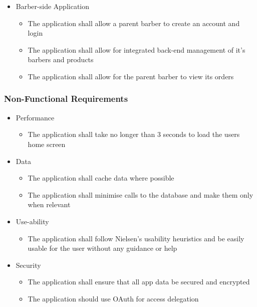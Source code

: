 \documentclass[12pt]{article}
\begin{document}
	\begin{itemize}
		\item Barber-side Application
		\begin{itemize}
			\item The application shall allow a parent barber to create an account and login
			\item The application shall allow for integrated back-end management of it's barbers and products
			\item The application shall allow for the parent barber to view its orders
		\end{itemize}
	\end{itemize}
	
	\subsubsection{Non-Functional Requirements}
	
	\begin{itemize}
		\item Performance
		\begin{itemize}
			\item The application shall take no longer than 3 seconds to load the users home screen
		\end{itemize}
	\end{itemize}

	\begin{itemize}
	\item Data
	\begin{itemize}
		\item The application shall cache data where possible
		\item The application shall minimise calls to the database and make them only when relevant
	\end{itemize}
	\end{itemize}

	\begin{itemize}
		\item Use-ability
		\begin{itemize}
			\item The application shall follow Nielsen's usability heuristics and be easily usable for the user without any guidance or help
		\end{itemize}
	\end{itemize}

	\begin{itemize}
		\item Security
		\begin{itemize}
			\item The application shall ensure that all app data be secured and encrypted
			\item The application should use OAuth for access delegation
		\end{itemize}
	\end{itemize}
\end{document}
